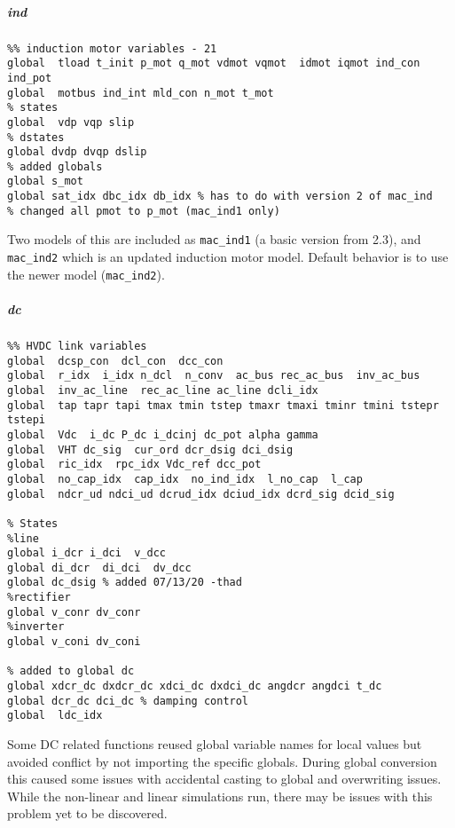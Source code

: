 \documentclass[12pt]{article}
\begin{document}
\subparagraph{ind}
\begin{verbatim}
%% induction motor variables - 21
global  tload t_init p_mot q_mot vdmot vqmot  idmot iqmot ind_con ind_pot
global  motbus ind_int mld_con n_mot t_mot
% states
global  vdp vqp slip
% dstates
global dvdp dvqp dslip
% added globals
global s_mot
global sat_idx dbc_idx db_idx % has to do with version 2 of mac_ind
% changed all pmot to p_mot (mac_ind1 only)
\end{verbatim}
Two models of this are included as \verb|mac_ind1| (a basic version from 2.3), and \verb|mac_ind2| which is an updated induction motor model. Default behavior is to use the newer model (\verb|mac_ind2|).

\subparagraph{dc}
\begin{verbatim}
%% HVDC link variables 
global  dcsp_con  dcl_con  dcc_con
global  r_idx  i_idx n_dcl  n_conv  ac_bus rec_ac_bus  inv_ac_bus
global  inv_ac_line  rec_ac_line ac_line dcli_idx
global  tap tapr tapi tmax tmin tstep tmaxr tmaxi tminr tmini tstepr tstepi
global  Vdc  i_dc P_dc i_dcinj dc_pot alpha gamma 
global  VHT dc_sig  cur_ord dcr_dsig dci_dsig
global  ric_idx  rpc_idx Vdc_ref dcc_pot
global  no_cap_idx  cap_idx  no_ind_idx  l_no_cap  l_cap
global  ndcr_ud ndci_ud dcrud_idx dciud_idx dcrd_sig dcid_sig

% States
%line
global i_dcr i_dci  v_dcc
global di_dcr  di_dci  dv_dcc
global dc_dsig % added 07/13/20 -thad
%rectifier
global v_conr dv_conr
%inverter
global v_coni dv_coni

% added to global dc
global xdcr_dc dxdcr_dc xdci_dc dxdci_dc angdcr angdci t_dc
global dcr_dc dci_dc % damping control
global  ldc_idx
\end{verbatim}
Some DC related functions reused global variable names for local values but avoided conflict by not importing the specific globals.
During global conversion this caused some issues with accidental casting to global and overwriting issues.
While the non-linear and linear simulations run, there may be issues with this problem yet to be discovered.

\begin{comment}



\subparagraph{xxx}
\begin{verbatim}

\end{verbatim}


\end{comment}
\end{document}
